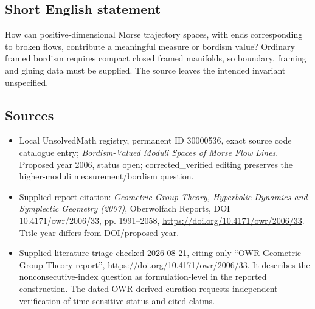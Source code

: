 \documentclass[11pt]{article}
\begin{document}
\subsection{Short English statement}
How can positive-dimensional Morse trajectory spaces, with ends corresponding to broken flows, contribute a meaningful measure or bordism value? Ordinary framed bordism requires compact closed framed manifolds, so boundary, framing and gluing data must be supplied. The source leaves the intended invariant unspecified.
\subsection{Sources}
\begin{itemize}
\item Local UnsolvedMath registry, permanent ID 30000536, exact source code catalogue entry; \emph{Bordism-Valued Moduli Spaces of Morse Flow Lines}. Proposed year 2006, status open; corrected\_verified editing preserves the higher-moduli measurement/bordism question.
\item Supplied report citation: \emph{Geometric Group Theory, Hyperbolic Dynamics and Symplectic Geometry (2007)}, Oberwolfach Reports, DOI 10.4171/owr/2006/33, pp. 1991--2058, \url{https://doi.org/10.4171/owr/2006/33}. Title year differs from DOI/proposed year.
\item Supplied literature triage checked 2026-08-21, citing only ``OWR Geometric Group Theory report'', \url{https://doi.org/10.4171/owr/2006/33}. It describes the nonconsecutive-index question as formulation-level in the reported construction. The dated OWR-derived curation requests independent verification of time-sensitive status and cited claims.
\end{itemize}
\end{document}
